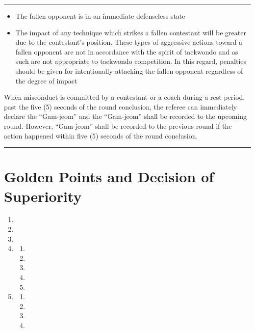 \documentclass[draft]{report}
\newenvironment{expl}[0]%
  {\rule{\textwidth}{.2pt}\footnotesize}%
  {\rule{\textwidth}{.2pt}\normalsize}
\begin{document}
\begin{expl}
\begin{enumerate}
  \begin{itemize}
  \item
    The fallen opponent is in an immediate defenseless state
  \item
    The impact of any technique which strikes a fallen contestant will
    be greater due to the contestant's position. These types of
    aggressive actions toward a fallen opponent are not in accordance
    with the spirit of taekwondo and as such are not appropriate to
    taekwondo competition. In this regard, penalties should be given for
    intentionally attacking the fallen opponent regardless of the degree
    of impact
  \end{itemize}
\end{enumerate}

When misconduct is committed by a contestant or a coach during a rest
period, past the five (5) seconds of the round conclusion, the referee
can immediately declare the ``Gam-jeom'' and the ``Gam-jeom'' shall be
recorded to the upcoming round. However, ``Gam-jeom'' shall be recorded
to the previous round if the action happened within five (5) seconds of
the round conclusion.

\end{expl}


\chapter{Golden Points and Decision of Superiority}\label{golden-points-and-decision-of-superiority}

\begin{enumerate}
\item

\item

\item

\item

    \begin{enumerate}
    \item
    
    \item
    
    \item
    
    \item
    
    \item
    
    \end{enumerate}
\item

    \begin{enumerate}
    \item
    
    \item
    
    \item
    
    \item
    
    \end{enumerate}
\end{enumerate}
\end{document}
